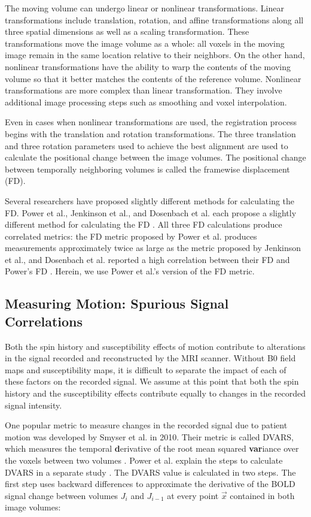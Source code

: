 The moving volume can undergo linear or nonlinear transformations. Linear transformations include translation, rotation, and affine transformations along all three spatial dimensions as well as a scaling transformation. These transformations move the image volume as a whole: all voxels in the moving image remain in the same location relative to their neighbors. On the other hand, nonlinear transformations have the ability to warp the contents of the moving volume so that it better matches the contents of the reference volume. Nonlinear transformations are more complex than linear transformation. They involve additional image processing steps such as smoothing and voxel interpolation.

Even in cases when nonlinear transformations are used, the registration process begins with the translation and rotation transformations. The three translation and three rotation parameters used to achieve the best alignment are used to calculate the positional change between the image volumes. The positional change between temporally neighboring volumes is called the framewise displacement (FD).  

Several researchers have proposed slightly different methods for calculating the FD. Power et al., Jenkinson et al., and Dosenbach et al. each propose a slightly different method for calculating the FD \cite{Power2012} \cite{Jenkinson2002} \cite{Dosenbach2017}. All three FD calculations produce correlated metrics: the FD metric proposed by Power et al. produces measurements approximately twice as large as the metric proposed by Jenkinson et al., and Dosenbach et al. reported a high correlation between their FD and Power’s FD \cite{Yan2013a} \cite{Dosenbach2017}. Herein, we use Power et al.'s version of the FD metric.

\subsection{Measuring Motion: Spurious Signal Correlations}

Both the spin history and susceptibility effects of motion contribute to alterations in the signal recorded and reconstructed by the MRI scanner. Without B0 field maps and susceptibility maps, it is difficult to separate the impact of each of these factors on the recorded signal. We assume at this point that both the spin history and the susceptibility effects contribute equally to changes in the recorded signal intensity.

One popular metric to measure changes in the recorded signal due to patient motion was developed by Smyser et al. in 2010. Their metric is called DVARS, which measures the temporal \textbf{d}erivative of the root mean squared \textbf{var}iance over the voxels between two volumes \cite{Smyser2010}. Power et al. explain the steps to calculate DVARS in a separate study \cite{Power2012}. The DVARS value is calculated in two steps. The first step uses backward differences to approximate the derivative of the BOLD signal change between volumes $J_i$ and $J_{i-1}$ at every point $\vec{x}$ contained in both image volumes:

